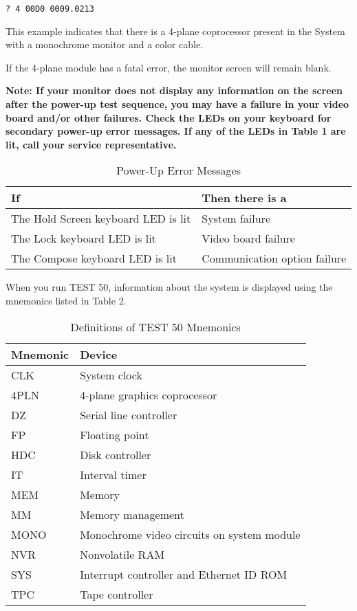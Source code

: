 \documentclass{dec}
\begin{document}
{\tt ? 4 00D0  0009.0213}

This example indicates that there is a 4-plane coprocessor present in the
System with a monochrome monitor and a color cable.

If the 4-plane module has a fatal error, the monitor screen will remain blank.

\textbf{Note: If your monitor does not display any information on the screen after
the power-up test sequence, you may have a failure in your video board
and/or other failures.  Check the LEDs on your keyboard for secondary
power-up error messages. If any of the LEDs in Table 1 are lit, call your
service representative.}

\begin{table}[H]
\label{table:1}
\caption{Power-Up Error Messages}
\begin{tabularx}{\textwidth}{l l}
\hline
\textbf{If} & \textbf{Then there is a}\\
\hline
The Hold Screen keyboard LED is lit & System failure\\
The Lock keyboard LED is lit & Video board failure \\
The Compose keyboard LED is lit & Communication option failure\\
\hline
\end{tabularx}
\end{table}

When you run TEST 50, information about the system is displayed using the mnemonics listed in Table 2.

\begin{table}[H]
\label{table:2}
\caption{Definitions of TEST 50 Mnemonics}
\begin{tabularx}{\textwidth}{l l}
\hline
\textbf{Mnemonic} & \textbf{Device}\\
\hline
CLK & System clock \\
4PLN & 4-plane graphics coprocessor \\
DZ & Serial line controller \\
FP & Floating point \\
HDC & Disk controller \\
IT & Interval timer \\
MEM & Memory \\
MM & Memory management \\
MONO & Monochrome video circuits on system module \\
NVR & Nonvolatile RAM \\
SYS & Interrupt controller and Ethernet ID ROM \\
TPC & Tape controller \\
\hline
\end{tabularx}
\end{table}
\end{document}
